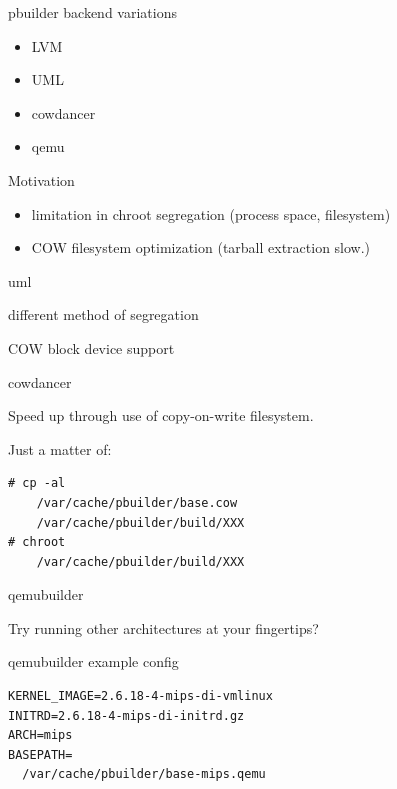 \documentclass[dvipdfm,17pt,times]{beamer}
\begin{document}
\begin{frame}{pbuilder backend variations}

\begin{minipage}{0.35\hsize}
  \begin{itemize}
  \item LVM
  \item UML
  \item cowdancer
  \item qemu
 \end{itemize}
\end{minipage}
\begin{minipage}{0.6\hsize}
 \colorbox{titleback}{
\begin{minipage}{1\hsize}
 Motivation
\begin{itemize}
 \item limitation in chroot segregation (process space, filesystem)
 \item COW filesystem optimization (tarball extraction slow.)
\end{itemize}
\end{minipage}
}
\end{minipage}
\end{frame}

\begin{frame}{uml}
 
 different method of segregation
 
 COW block device support

\end{frame}

\begin{frame}[containsverbatim]{cowdancer}
 
 Speed up through use of copy-on-write filesystem.

 Just a matter of:

\begin{verbatim}
# cp -al
    /var/cache/pbuilder/base.cow 
    /var/cache/pbuilder/build/XXX
# chroot
    /var/cache/pbuilder/build/XXX
\end{verbatim}
\end{frame}

\begin{frame}{qemubuilder}

 Try running other architectures at your fingertips?
\end{frame}

\begin{frame}[containsverbatim]{qemubuilder example config}

\begin{verbatim}
KERNEL_IMAGE=2.6.18-4-mips-di-vmlinux
INITRD=2.6.18-4-mips-di-initrd.gz
ARCH=mips
BASEPATH=
  /var/cache/pbuilder/base-mips.qemu
\end{verbatim}
\end{frame}
\end{document}
